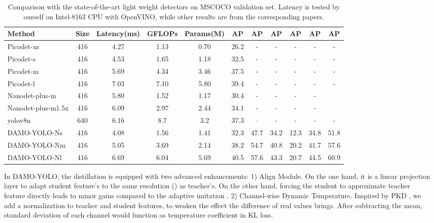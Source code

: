 \documentclass[10pt,twocolumn,letterpaper]{article}
\begin{document}
\begin{table*}[t!]
\begin{center}
\caption{Comparison with the state-of-the-art light weight detectors on MSCOCO validation set. Latency is tested by ourself on Intel-8163 CPU with OpenVINO, while other results are from the corresponding papers.}
\label{coco_nano}
\setlength{\tabcolsep}{2pt}
\begin{tabular}{l|c|c|c|c|c|c|c|c|c|c}
\toprule
Method & Size & Latency(ms) & GFLOPs & Params(M) & AP & AP & AP & AP & AP & AP \\
\midrule
Picodet-xs & 416 & 4.27 & 1.13 & 0.70 & 26.2 & - & - & - & - & - \\
Picodet-s & 416 & 4.53 & 1.65 & 1.18 & 32.5 & - & - & - & - & - \\
Picodet-m & 416 & 5.69 & 4.34 & 3.46 & 37.5 & - & - & - & - & - \\
Picodet-l & 416 & 7.03 & 7.10 & 5.80 & 39.4 & - & - & - & - & - \\
\midrule
Nanodet-plus-m & 416 & 5.80 & 1.52 & 1.17 & 30.4  & - & - & - & - \\
Nanodet-plus-m1.5x & 416 & 6.09 & 2.97 & 2.44 & 34.1 & - & - & - & - \\
\midrule
yolov8n & 640 & 6.16 & 8.7 & 3.2 & 37.3 & -- & - & - & - & - \\
\midrule
DAMO-YOLO-Ns & 416 & 4.08 & 1.56& 1.41  & 32.3 & 47.7 & 34.2 & 12.3 & 34.8 & 51.8 \\
DAMO-YOLO-Nm & 416 & 5.05 & 3.69& 2.14  & 38.2 & 54.7 & 40.8 & 20.2 & 41.7 & 57.6 \\
DAMO-YOLO-Nl & 416 & 6.69 & 6.04& 5.69  & 40.5 & 57.6 & 43.3 & 20.7 & 44.5 & 60.9 \\
\bottomrule
\end{tabular}
\end{center}
\end{table*}

In DAMO-YOLO, the distillation is equipped with two advanced enhancements: 1) Align Module. On the one hand, it is a linear projection layer to adapt student feature’s to the same resolution () as teacher's. On the other hand, forcing the student to approximate teacher feature directly leads to minor gains compared to the adaptive imitation \cite{wang2019distilling}. 2) Channel-wise Dynamic Temperature. Inspired by PKD \cite{cao2022pkd}, we add a normalization to teacher and student features, to weaken the effect the difference of real values brings. After subtracting the mean, standard deviation of each channel would function as temperature coefficient in KL loss. 
\end{document}
